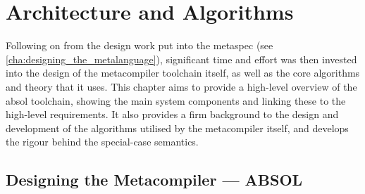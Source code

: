 % 

\chapter{Architecture and Algorithms} %
\label{cha:architecture_and_algorithms}

Following on from the design work put into the \gls{metaspec} (see \autoref{cha:designing_the_metalanguage}), significant time and effort was then invested into the design of the metacompiler toolchain itself, as well as the core algorithms and theory that it uses. 
This chapter aims to provide a high-level overview of the \gls{absol} toolchain, showing the main system components and linking these to the high-level requirements.
It also provides a firm background to the design and development of the algorithms utilised by the metacompiler itself, and develops the rigour behind the special-case semantics. 

\section{Designing the Metacompiler --- ABSOL} %
\label{sec:designing_the_metacompiler_absol}

